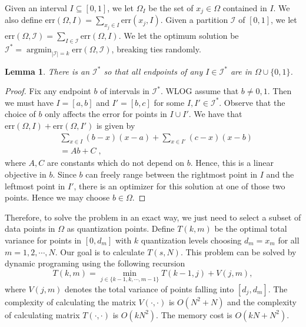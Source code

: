 \documentclass{article}
\newcommand{\err}{\ensuremath{\mathrm{err}}}
\newcommand{\setX}{\Omega}
\newcommand{\setI}{\mathcal{I}}
\newcommand{\OPT}{\ensuremath{\mathrm{OPT}}}
\DeclareMathOperator*{\argmin}{argmin}
\newtheorem{lemma}{Lemma}
\begin{document}

Given an interval $I \subseteq [0, 1]$, we let $\setX_I$ be the set of $x_j \in \setX$ contained in $I$.
We also define $\err (\setX, I) = \sum_{x_j \in I} \err (x_j, I)$.
Given a partition $\setI$ of $[0, 1]$, we let $\err (\setX, \setI) = \sum_{I \in \setI} \err (\setX, I)$.
We let the optimum solution be $\setI^* = \argmin_{|\setI| = k} \err (\setX, \setI)$, breaking ties randomly. %


\begin{lemma}
\label{lem:discrete}
There is an $\setI^*$ so that all endpoints of any $I \in \setI^*$ are in $\Omega \cup \{0, 1\}$.
\end{lemma}



\begin{proof}
Fix any endpoint $b$ of intervals in $\setI^*$. WLOG assume that $b \neq 0, 1$. Then we must have $I = [a, b]$ and $I' = [b, c]$ for some $I, I' \in \setI^*$. Observe that the choice of $b$ only affects the error for points in $I \cup I'$. We have that $\err (\Omega, I) + \err (\Omega, I') $ is given by 
\begin{align*}
& \sum_{x \in I} (b - x) (x - a) + \sum_{x \in I'} (c -x)(x - b) \\
&= A b + C \; ,
\end{align*}
where $A, C$ are constants which do not depend on $b$. Hence, this is a linear objective in $b$. Since $b$ can freely range between the rightmost point in $I$ and the leftmost point in $I'$, there is an optimizer for this solution at one of those two points. Hence we may choose $b \in \Omega$.
\end{proof}


Therefore, to solve the problem in an exact way, we just need to select a subset of data points in $\Omega$ as quantization points. Define $T(k, m)$ be the optimal total variance for points in $[0, d_m]$ with $k$ quantization levels choosing $d_m=x_m$ for all $m=1,2,\cdots, N$. Our goal is to calculate $T(s, N)$. This problem can be solved by dynamic programing using the following recursion
\[
T(k, m) = \min_{j\in \{k-1, k, \cdots, m-1\}} T(k-1,j) + V(j,m),
\]
where $V(j,m)$ denotes the total variance of points falling into $[d_j, d_m]$. The complexity of calculating the matrix $V(\cdot, \cdot)$ is $O(N^2 + N)$ and the complexity of calculating matrix $T(\cdot, \cdot)$ is $O(kN^2)$. The  memory cost is $O(kN + N^2)$. 
\end{document}

